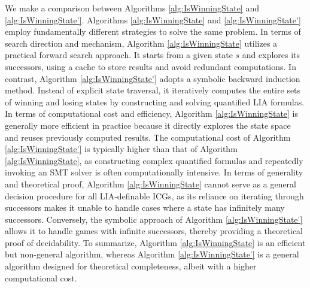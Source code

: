 \documentclass[review]{elsarticle}
\begin{document}
    We make a comparison between Algorithms \ref{alg:IsWinningState} and \ref{alg:IsWinningState'}.
    Algorithms \ref{alg:IsWinningState} and \ref{alg:IsWinningState'} employ fundamentally different strategies to solve the same problem. 
    In terms of search direction and mechanism, Algorithm \ref{alg:IsWinningState} utilizes a practical forward search approach. 
	It starts from a given state $s$ and explores its successors, using a cache to store results and avoid redundant computations. 
	In contrast, Algorithm \ref{alg:IsWinningState'} adopts a symbolic backward induction method. 
	Instead of explicit state traversal, it iteratively computes the entire sets of winning and losing states by constructing and solving quantified LIA formulas.
    In terms of computational cost and efficiency, Algorithm \ref{alg:IsWinningState} is generally more efficient in practice because it directly explores the state space and reuses previously computed results.
	The computational cost of Algorithm \ref{alg:IsWinningState'} is typically higher than that of Algorithm \ref{alg:IsWinningState}, as constructing complex quantified formulas and repeatedly invoking an SMT solver is often computationally intensive.
    In terms of generality and theoretical proof, Algorithm \ref{alg:IsWinningState} cannot serve as a general decision procedure for all LIA-definable ICGs, as its reliance on iterating through successors makes it unable to handle cases where a state has infinitely many successors.
	Conversely, the symbolic approach of Algorithm \ref{alg:IsWinningState'} allows it to handle games with infinite successors, thereby providing a theoretical proof of decidability.
    To summarize, Algorithm \ref{alg:IsWinningState} is an efficient but non-general algorithm, whereas Algorithm \ref{alg:IsWinningState'} is a general algorithm designed for theoretical completeness, albeit with a higher computational cost.

%    	
\end{document}
